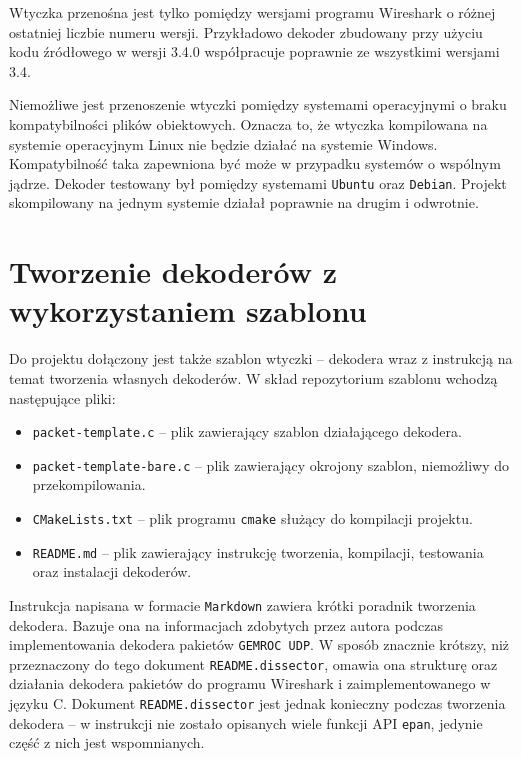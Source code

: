 \documentclass[a4paper, 11pt, twoside, openright]{article}
\begin{document}
	Wtyczka przenośna jest tylko pomiędzy wersjami programu Wireshark o różnej ostatniej liczbie numeru wersji.
	Przykładowo dekoder zbudowany przy użyciu kodu źródłowego w wersji 3.4.0 współpracuje poprawnie ze wszystkimi wersjami
	3.4.

	Niemożliwe jest przenoszenie wtyczki pomiędzy systemami operacyjnymi o braku kompatybilności plików obiektowych.
	Oznacza to, że wtyczka kompilowana na systemie operacyjnym Linux nie będzie działać na systemie Windows.
	Kompatybilność taka zapewniona być może w przypadku systemów o wspólnym jądrze. Dekoder testowany był
	pomiędzy systemami \texttt{Ubuntu} oraz \texttt{Debian}. Projekt skompilowany na jednym systemie działał poprawnie
	na drugim i odwrotnie.

\cleardoublepage
\section{Tworzenie dekoderów z wykorzystaniem szablonu}

	\indent\par
	Do projektu dołączony jest także szablon wtyczki -- dekodera wraz z instrukcją na temat tworzenia własnych dekoderów.
	W skład repozytorium szablonu wchodzą następujące pliki:
	\begin{itemize}
		\item \texttt{packet-template.c} -- plik zawierający szablon działającego dekodera.
		\item \texttt{packet-template-bare.c} -- plik zawierający okrojony szablon, niemożliwy do przekompilowania.
		\item \texttt{CMakeLists.txt} -- plik programu \texttt{cmake} służący do kompilacji projektu.
		\item \texttt{README.md} -- plik zawierający instrukcję tworzenia, kompilacji, testowania oraz instalacji dekoderów.
	\end{itemize}

	Instrukcja napisana w formacie \texttt{Markdown} zawiera krótki poradnik tworzenia dekodera. Bazuje ona na informacjach
	zdobytych przez autora podczas implementowania dekodera pakietów \texttt{GEMROC UDP}. W sposób znacznie krótszy,
	niż przeznaczony do tego dokument \texttt{README.dissector}, omawia ona strukturę oraz działania dekodera pakietów
	do programu Wireshark i zaimplementowanego w języku C. Dokument \texttt{README.dissector} jest jednak konieczny podczas
	tworzenia dekodera -- w instrukcji nie zostało opisanych wiele funkcji API \texttt{epan}, jedynie część z nich jest
	wspomnianych.
\end{document}
